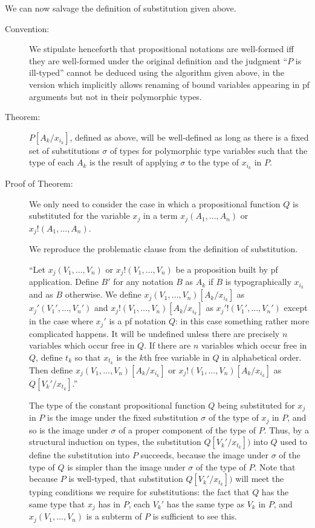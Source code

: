 \documentclass{article}
\begin{document}
We can now salvage the definition of substitution given above.

\begin{description}

\item[Convention:] We stipulate henceforth that propositional
notations are well-formed iff they are well-formed under the original
definition and the judgment ``$P$ is ill-typed'' cannot be deduced
using the algorithm given above, in the version which implicitly
allows renaming of bound variables appearing in pf arguments but not
in their polymorphic types.

\item[Theorem:] $P[A_k/x_{i_k}]$, defined as above, will be
well-defined as long as there is a fixed set of substitutions $\sigma$
of types for polymorphic type variables such that the type of each
$A_k$ is the result of applying $\sigma$ to the type of $x_{i_k}$ in
$P$.

\item[Proof of Theorem:] We only need to consider the case in which a
propositional function $Q$ is substituted for the variable $x_j$ in a
term $x_j(A_1,\ldots,A_n)$ or $x_j!(A_1,\ldots,A_n)$.  

We reproduce the problematic clause from the definition of
substitution.

``Let $x_j(V_1,\ldots,V_n)$ or $x_j!(V_1,\ldots,V_n)$ be a
proposition built by pf application.  Define $B'$ for any notation $B$
as $A_k$ if $B$ is typographically $x_{i_k}$ and as $B$ otherwise.  We
define $x_j(V_1,\ldots,V_n)[A_k/x_{i_k}]$ as $x_j'(V_1',\ldots,V_n')$
and $x_j!(V_1,\ldots,V_n)[A_k/x_{i_k}]$ as $x_j'!(V_1',\ldots,V_n')$
except in the case where $x_j'$ is a pf notation $Q$: in this case
something rather more complicated happens.  It will be undefined
unless there are precisely $n$ variables which occur free in $Q$.  If
there are $n$ variables which occur free in $Q$, define $t_k$ so that
$x_{t_k}$ is the $k$th free variable in $Q$ in alphabetical order.
Then define $x_j(V_1,\ldots,V_n)[A_k/x_{i_k}]$ or
$x_j!(V_1,\ldots,V_n)[A_k/x_{i_k}]$ as $Q[V_k'/x_{t_k}]$.''

  The type of the constant propositional function $Q$
being substituted for $x_j$ in $P$ is the image under the fixed
substitution $\sigma$ of the type of $x_j$ in $P$, and so is the image
under $\sigma$ of a proper component of the type of $P$.  Thus, by a
structural induction on types, the substitution $Q[V_k'/x_{t_k}])$
into $Q$ used to define the substitution into $P$ succeeds, because
the image under $\sigma$ of the type of $Q$ is simpler than the image
under $\sigma$ of the type of $P$.  Note that because $P$ is
well-typed, that substitution $Q[V_k'/x_{t_k}])$ will meet the typing
conditions we require for substitutions:  the fact that $Q$ has the same
type that $x_j$ has in $P$, each $V_k'$ has the same type as $V_k$ in $P$,
and $x_j(V_1,\ldots,V_n)$ is a subterm of $P$ is sufficient to see this.

\end{description}
\end{document}
